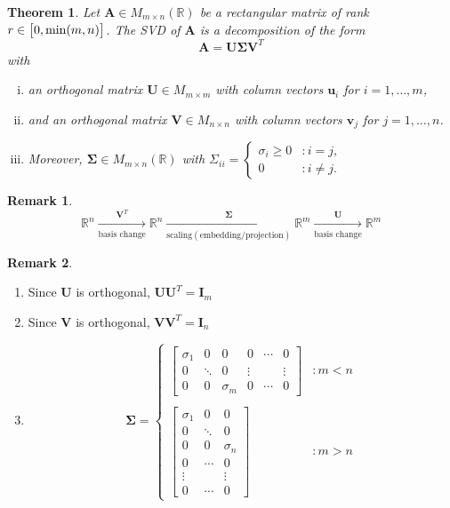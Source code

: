 \documentclass[12pt,openany]{book}
\newtheorem{theorem}{Theorem}[chapter]
\theoremstyle{definition}
\newtheorem{remark}{Remark}[chapter]
\newcommand{\R}{\mathbb{R}}
\newcommand{\by}{\times}
\begin{document}
	\begin{tcolorbox}[colframe=thmcolor,title={\color{white}\bf SVD Theorem}]
		\begin{theorem}
			Let \(\textbf{A}\in M_{m\by n}(\R)\) be a rectangular matrix of rank \(r\in\intcc{0,\min(m,n)}\). The SVD of \(\textbf{A}\) is a decomposition of the form \[
			\textbf{A}=\textbf{U}\boldsymbol{\Sigma}\textbf{V}^T
			\] with \begin{enumerate}[(i)]
				\item an orthogonal matrix \(\textbf{U}\in M_{m\by m}\) with column vectors \(\textbf{u}_i\) for $i=1,\dots, m$,
				\item and an orthogonal matrix \(\textbf{V}\in M_{n\by n}\) with column vectors \(\textbf{v}_j\) for $j=1,\dots, n$.
				\item Moreover, \(\boldsymbol{\Sigma}\in M_{m\by n}(\R)\) with \(\Sigma_{ii}=\begin{cases}
					\sigma_i\geq0 &:i=j,\\
					0 &:i\neq j.
				\end{cases}\)
			\end{enumerate}
		\end{theorem}
	\end{tcolorbox}
	\begin{remark}
		\[
		\R^n\xrightarrow[\text{basis change}]{\textbf{V}^T}\R^n\xrightarrow[\text{scaling}
			(\text{embedding}
			/\text{projection})]{\boldsymbol{\Sigma}}\R^m\xrightarrow[\text{basis change}]{\textbf{U}}\R^m
		\]
	\end{remark}
	\begin{remark}
		\ \begin{enumerate}[(1)]
			\item Since \(\textbf{U}\) is orthogonal, \(\textbf{UU}^T=\textbf{I}_m\)
			\item Since \(\textbf{V}\) is orthogonal, \(\textbf{VV}^T=\textbf{I}_n\)
			\item \[
			\boldsymbol{\Sigma}=\begin{cases}
				\begin{bmatrix}
					\sigma_1 & 0 & 0 & 0 & \cdots & 0\\
					0 & \ddots & 0 & \vdots & & \vdots\\
					0 & 0 & \sigma_m & 0 & \cdots & 0
				\end{bmatrix}&:m<n\\
				\\
				\begin{bmatrix}
					\sigma_1 & 0 & 0\\
					0 & \ddots & 0\\
					0 & 0 & \sigma_n\\
					0 & \cdots & 0\\
					\vdots &  & \vdots\\
					0 & \cdots & 0
				\end{bmatrix}&:m>n
			\end{cases}
			\]
		\end{enumerate}
	\end{remark}
	
\end{document}
